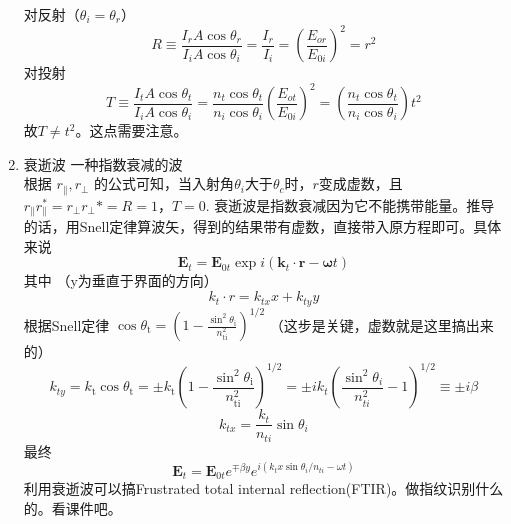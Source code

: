 \documentclass{ctexart}
\begin{document}
\begin{enumerate}
对反射（$\theta_{i}=\theta_{r}$）
\begin{equation}
R \equiv \frac{I_{r} A \cos \theta_{r}}{I_{i} A \cos \theta_{i}}=\frac{I_{r}}{I_{i}}=\left(\frac{E_{o r}}{E_{0 i}}\right)^{2}=r^{2}
\end{equation}
对投射
\begin{equation}
T \equiv \frac{I_{t} A \cos \theta_{t}}{I_{i} A \cos \theta_{i}}=\frac{n_{t} \cos \theta_{t}}{n_{i} \cos \theta_{i}}\left(\frac{E_{o t}}{E_{0 i}}\right)^{2}=\left(\frac{n_{t} \cos \theta_{t}}{n_{i} \cos \theta_{i}}\right) t^{2}
\end{equation}
故$T\neq t^2$。这点需要注意。
\item 衰逝波 一种指数衰减的波\\
根据 $r_{\|},r_{\perp}$ 的公式可知，当入射角$\theta_i$大于$\theta_c$时，$r$变成虚数，且$r_{\|}r_{\|}^*=r_{\perp}r_{\perp}*=R=1$，$T=0$. 衰逝波是指数衰减因为它不能携带能量。推导的话，用Snell定律算波矢，得到的结果带有虚数，直接带入原方程即可。具体来说
\begin{equation}
\boldsymbol{E}_{t}=\boldsymbol{E}_{0t} \exp i\left(\boldsymbol{k}_{t} \cdot \boldsymbol{r}-\boldsymbol{\omega} t\right)
\end{equation}
其中 （y为垂直于界面的方向）
\begin{equation}
k_{t} \cdot r=k_{t x} x+k_{t y} y
\end{equation}
根据Snell定律 $\cos \theta_{\mathrm{t}}=\left(1-\frac{\sin ^{2} \theta_{\mathrm{i}}}{n_{\mathrm{ti}}^{2}}\right)^{1 / 2}$ （这步是关键，虚数就是这里搞出来的）
\begin{equation}
k_{t y}=k_{\mathrm{t}} \cos \theta_{\mathrm{t}}=\pm k_{\mathrm{t}}\left(1-\frac{\sin ^{2} \theta_{\mathrm{i}}}{n_{\mathrm{ti}}^{2}}\right)^{1 / 2}=\pm i k_{t}\left(\frac{\sin ^{2} \theta_{i}}{n_{t i}^{2}}-1\right)^{1 / 2} \equiv \pm i \beta
\end{equation}
\begin{equation}
k_{t x}=\frac{k_{t}}{n_{t i}} \sin \theta_{i}
\end{equation}
最终
\begin{equation}
\boldsymbol{E}_{t}=\boldsymbol{E}_{0 t} e^{\mp \beta y} e^{i\left(k_{t} x \sin \theta_{i} / n_{t i}-\omega t\right)}
\end{equation}
利用衰逝波可以搞Frustrated total internal reflection(FTIR)。做指纹识别什么的。看课件吧。


\end{enumerate}
\end{document}
